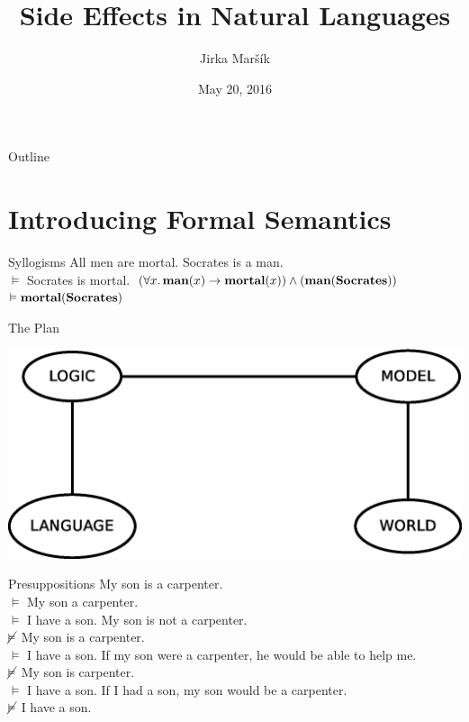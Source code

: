 \documentclass{beamer}
\title{Side Effects in Natural Languages}
\author{Jirka Maršík}
\date{May 20, 2016}
\institute{Sémagramme}
\begin{document}
\begin{frame}
  \maketitle
\end{frame}


\begin{frame}{Outline}
  \tableofcontents
\end{frame}



\section{Introducing Formal Semantics}


\begin{frame}{Syllogisms}
All men are mortal. Socrates is a man. \\
$\vDash$ Socrates is mortal.
\vfill
\pause
$(\forall x.\, \textbf{man}(x) \to \textbf{mortal}(x)) \land
(\textbf{man}(\textbf{Socrates}))$ \\
$\vDash \textbf{mortal}(\textbf{Socrates})$
\end{frame}


\begin{frame}{The Plan}
  \begin{center}
  \includegraphics[width=\textheight]{plan}
  \end{center}
\end{frame}


\begin{frame}{Presuppositions}
My son is a carpenter. \\
$\vDash$ My son a carpenter. \\
$\vDash$ I have a son.
\vfill
\pause
My son is not a carpenter. \\
$\cancel{\vDash}$ My son is a carpenter. \\
$\vDash$ I have a son.
\vfill
\pause
If my son were a carpenter, he would be able to help me. \\
$\cancel{\vDash}$ My son is carpenter. \\
$\vDash$ I have a son.
\vfill
\pause
If I had a son, my son would be a carpenter. \\
$\cancel{\vDash}$ I have a son.
\end{frame}
\end{document}
